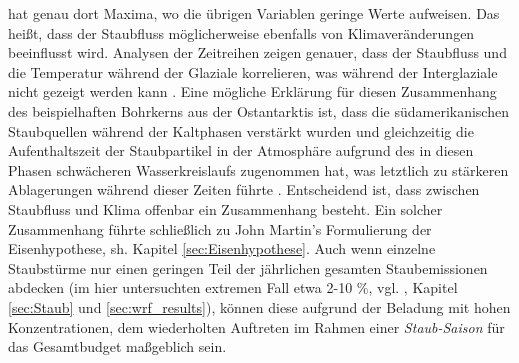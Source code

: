 \documentclass[12pt,a4paper,onecolumn,headheight=30pt]{scrartcl}
\begin{document}
hat genau dort Maxima, wo die übrigen Variablen geringe Werte aufweisen. Das heißt, dass der Staubfluss möglicherweise ebenfalls von Klimaveränderungen beeinflusst wird. Analysen der Zeitreihen zeigen genauer, dass der Staubfluss und die Temperatur während der Glaziale korrelieren, was während der Interglaziale nicht gezeigt werden kann \citep{Lambert.2008}. Eine mögliche Erklärung für diesen Zusammenhang des beispielhaften Bohrkerns aus der Ostantarktis ist, dass die südamerikanischen Staubquellen während der Kaltphasen verstärkt wurden und gleichzeitig die Aufenthaltszeit der Staubpartikel in der Atmosphäre aufgrund des in diesen Phasen schwächeren Wasserkreislaufs zugenommen hat, was letztlich zu stärkeren Ablagerungen während dieser Zeiten führte \citep{Lambert.2008}. Entscheidend ist, dass zwischen Staubfluss und Klima offenbar ein Zusammenhang besteht. Ein solcher Zusammenhang führte schließlich zu John Martin's Formulierung der Eisenhypothese, sh. Kapitel \ref{sec:Eisenhypothese}. Auch wenn einzelne Staubstürme nur einen geringen Teil der jährlichen gesamten Staubemissionen abdecken (im hier untersuchten extremen Fall etwa 2-10 \%, vgl. \citep{Shao.2011}, Kapitel \ref{sec:Staub} und \ref{sec:wrf_results}), können diese aufgrund der Beladung mit hohen Konzentrationen, dem wiederholten Auftreten im Rahmen einer \textit{Staub-Saison} für das Gesamtbudget maßgeblich sein. \\
\end{document}
